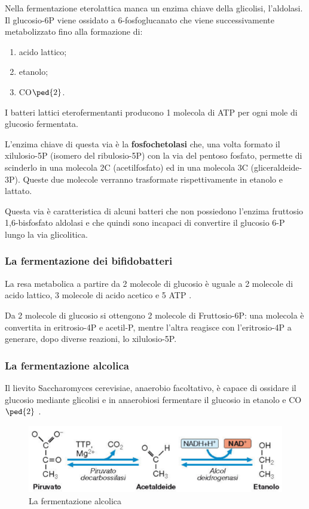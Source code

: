 \documentclass[11pt]{book}
\begin{document}
Nella fermentazione eterolattica manca un enzima chiave della glicolisi, l’aldolasi. Il glucosio-6P viene ossidato a 6-fosfoglucanato che viene successivamente metabolizzato fino alla formazione di:
\begin{enumerate}
\item acido lattico;
\item etanolo;
\item CO$\ped{2}$.
\end{enumerate}

I batteri lattici eterofermentanti producono 1 molecola di ATP per ogni mole di glucosio fermentata.

\vspace{1em}
L'enzima chiave di questa via è la \textbf{fosfochetolasi} che, una volta formato il xilulosio-5P (isomero del ribulosio-5P) con la via del pentoso fosfato, permette di scinderlo in una molecola 2C (acetilfosfato) ed in una molecola 3C (gliceraldeide-3P). Queste due molecole verranno trasformate rispettivamente in etanolo e lattato.

Questa  via è caratteristica di alcuni batteri che non possiedono l'enzima fruttosio 1,6-bisfosfato aldolasi e che quindi sono incapaci di convertire il glucosio 6-P lungo la via glicolitica.  

\subsubsection{La fermentazione dei bifidobatteri}
La resa metabolica a partire da 2 molecole di glucosio è uguale a 2 molecole di acido lattico, 3 molecole di acido acetico e 5 ATP .

Da 2 molecole di glucosio si ottengono 2 molecole di Fruttosio-6P: una molecola è convertita in eritrosio-4P e acetil-P, mentre l'altra reagisce con l’eritrosio-4P a generare, dopo diverse reazioni, lo xilulosio-5P.

\subsubsection{La fermentazione alcolica}
Il lievito Saccharomyces cerevisiae, anaerobio facoltativo, è capace di ossidare il glucosio mediante glicolisi e in anaerobiosi fermentare il glucosio in etanolo e CO$\ped{2}$ .

\begin{figure}[htp]
\centering
\includegraphics[scale=0.5]{img/Fermentazione alcolica.png}
\caption{La fermentazione alcolica}
\label{}
\end{figure}
\end{document}
